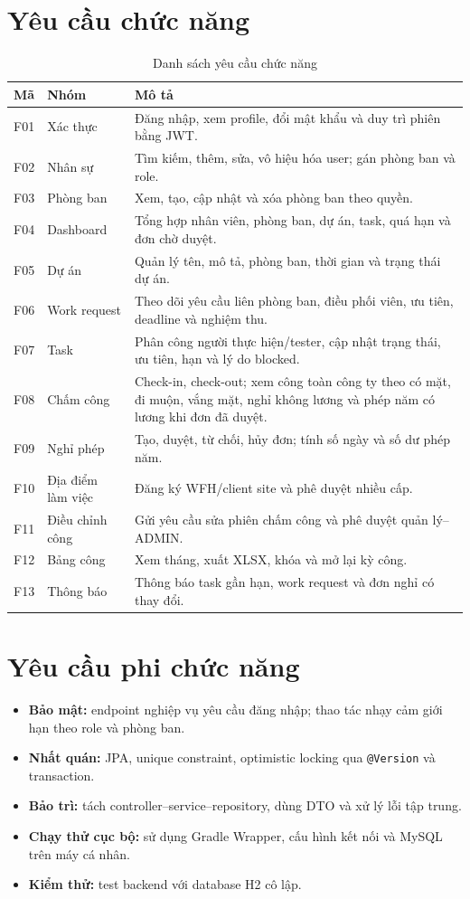 \documentclass[12pt,a4paper,oneside]{report}
\newcommand{\code}[1]{\texttt{#1}}
\begin{document}
\section{Yêu cầu chức năng}
\begin{longtable}{p{1.2cm}p{3.5cm}p{9cm}}\caption{Danh sách yêu cầu chức năng}\label{tab:functions}\\\toprule
\textbf{Mã}&\textbf{Nhóm}&\textbf{Mô tả}\\\midrule
F01&Xác thực&Đăng nhập, xem profile, đổi mật khẩu và duy trì phiên bằng JWT.\\
F02&Nhân sự&Tìm kiếm, thêm, sửa, vô hiệu hóa user; gán phòng ban và role.\\
F03&Phòng ban&Xem, tạo, cập nhật và xóa phòng ban theo quyền.\\
F04&Dashboard&Tổng hợp nhân viên, phòng ban, dự án, task, quá hạn và đơn chờ duyệt.\\
F05&Dự án&Quản lý tên, mô tả, phòng ban, thời gian và trạng thái dự án.\\
F06&Work request&Theo dõi yêu cầu liên phòng ban, điều phối viên, ưu tiên, deadline và nghiệm thu.\\
F07&Task&Phân công người thực hiện/tester, cập nhật trạng thái, ưu tiên, hạn và lý do blocked.\\
F08&Chấm công&Check-in, check-out; xem công toàn công ty theo có mặt, đi muộn, vắng mặt, nghỉ không lương và phép năm có lương khi đơn đã duyệt.\\
F09&Nghỉ phép&Tạo, duyệt, từ chối, hủy đơn; tính số ngày và số dư phép năm.\\
F10&Địa điểm làm việc&Đăng ký WFH/client site và phê duyệt nhiều cấp.\\
F11&Điều chỉnh công&Gửi yêu cầu sửa phiên chấm công và phê duyệt quản lý--ADMIN.\\
F12&Bảng công&Xem tháng, xuất XLSX, khóa và mở lại kỳ công.\\
F13&Thông báo&Thông báo task gần hạn, work request và đơn nghỉ có thay đổi.\\\bottomrule
\end{longtable}

\section{Yêu cầu phi chức năng}
\begin{itemize}
\item \textbf{Bảo mật:} endpoint nghiệp vụ yêu cầu đăng nhập; thao tác nhạy cảm giới hạn theo role và phòng ban.
\item \textbf{Nhất quán:} JPA, unique constraint, optimistic locking qua \code{@Version} và transaction.
\item \textbf{Bảo trì:} tách controller--service--repository, dùng DTO và xử lý lỗi tập trung.
\item \textbf{Chạy thử cục bộ:} sử dụng Gradle Wrapper, cấu hình kết nối và MySQL trên máy cá nhân.
\item \textbf{Kiểm thử:} test backend với database H2 cô lập.
\end{itemize}
\end{document}
